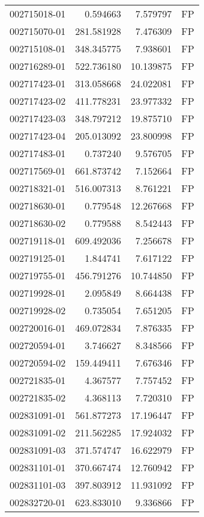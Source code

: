 \begin{tabular}{lrrl}
002715018-01 &    0.594663 &     7.579797 &   FP \\
002715070-01 &  281.581928 &     7.476309 &   FP \\
002715108-01 &  348.345775 &     7.938601 &   FP \\
002716289-01 &  522.736180 &    10.139875 &   FP \\
002717423-01 &  313.058668 &    24.022081 &   FP \\
002717423-02 &  411.778231 &    23.977332 &   FP \\
002717423-03 &  348.797212 &    19.875710 &   FP \\
002717423-04 &  205.013092 &    23.800998 &   FP \\
002717483-01 &    0.737240 &     9.576705 &   FP \\
002717569-01 &  661.873742 &     7.152664 &   FP \\
002718321-01 &  516.007313 &     8.761221 &   FP \\
002718630-01 &    0.779548 &    12.267668 &   FP \\
002718630-02 &    0.779588 &     8.542443 &   FP \\
002719118-01 &  609.492036 &     7.256678 &   FP \\
002719125-01 &    1.844741 &     7.617122 &   FP \\
002719755-01 &  456.791276 &    10.744850 &   FP \\
002719928-01 &    2.095849 &     8.664438 &   FP \\
002719928-02 &    0.735054 &     7.651205 &   FP \\
002720016-01 &  469.072834 &     7.876335 &   FP \\
002720594-01 &    3.746627 &     8.348566 &   FP \\
002720594-02 &  159.449411 &     7.676346 &   FP \\
002721835-01 &    4.367577 &     7.757452 &   FP \\
002721835-02 &    4.368113 &     7.720310 &   FP \\
002831091-01 &  561.877273 &    17.196447 &   FP \\
002831091-02 &  211.562285 &    17.924032 &   FP \\
002831091-03 &  371.574747 &    16.622979 &   FP \\
002831101-01 &  370.667474 &    12.760942 &   FP \\
002831101-03 &  397.803912 &    11.931092 &   FP \\
002832720-01 &  623.833010 &     9.336866 &   FP \\

\end{tabular}
